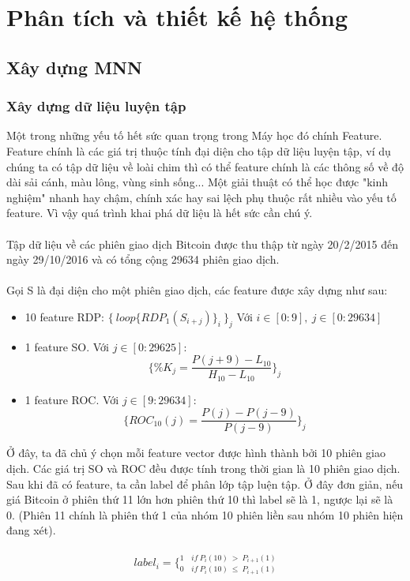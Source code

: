 \chapter{Phân tích và thiết kế hệ thống}
\section{Xây dựng MNN}
\subsection{Xây dựng dữ liệu luyện tập}
Một trong những yếu tố hết sức quan trọng trong Máy học đó chính Feature. 
Feature chính là các giá trị thuộc tính đại diện cho tập dữ liệu luyện tập, ví dụ 
chúng ta có tập dữ liệu về loài chim thì có thể feature chính là các thông số 
về độ dài sải cánh, màu lông, vùng sinh sống... Một giải thuật có thể học được 
"kinh nghiệm" nhanh hay chậm, chính xác hay sai lệch phụ thuộc rất nhiều vào yếu 
tố feature. Vì vậy quá trình khai phá dữ liệu là hết sức cần chú ý.\\\\
Tập dữ liệu về các phiên giao dịch Bitcoin được thu thập từ ngày 20/2/2015 đến 
ngày 29/10/2016 và có tổng cộng 29634 phiên giao dịch.\\\\
Gọi S là đại diện cho một phiên giao dịch, các feature được xây dựng như sau:
\begin{itemize}
    \item 10 feature RDP: $\{ \: loop\{ RDP_1(S_{i+j})\}_i \: \}_j$ Với 
    $i \in [0:9], \: j \in [0:29634]$
    \item 1 feature SO. Với $ j \in [0:29625] $:\\
    \[
        \{ \%K_j = \frac{P(j+9)-L_{10}}{H_{10}-L_{10}} \}_j
    \]
    \item 1 feature ROC. Với $ j \in [9:29634] $:\\ 
    \[
        \{ ROC_{10}(j)= \frac{P(j) - P(j-9)}{P(j-9)} \}_j
    \]
\end{itemize}
Ở đây, ta đã chủ ý chọn mỗi feature vector được hình thành bởi 10 phiên giao 
dịch. Các giá trị SO và ROC đều được tính trong thời gian là 10 phiên giao dịch.
Sau khi đã có feature, ta cần label để phân lớp tập luện tập. Ở đây đơn giản, 
nếu giá Bitcoin ở phiên thứ 11 lớn hơn phiên thứ 10 thì label sẽ là 1, ngược
lại sẽ là 0. (Phiên 11 chính là phiên thứ 1 của nhóm 10 phiên liền sau nhóm 
10 phiên hiện đang xét).\\\\
\[
    label_i = \bigg \{ _{0 \quad if \: P_i(10) \: \leq \: P_{i+1}(1)} ^{1 \quad if \: P_i(10) \: > \: P_{i+1}(1)}
\]
